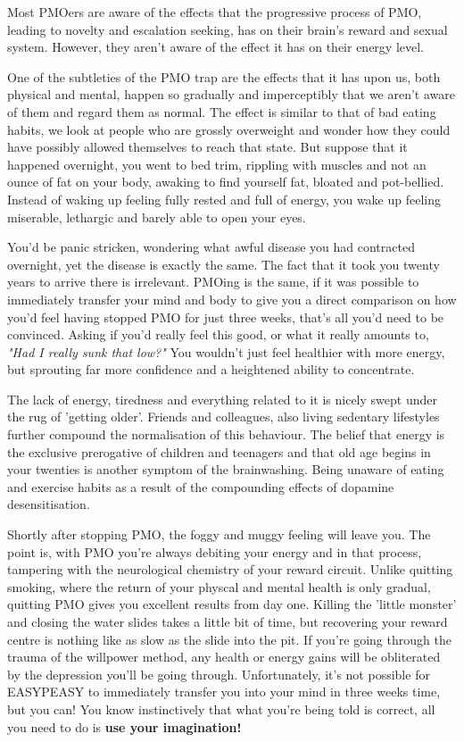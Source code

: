 \documentclass[easypeasy.tex]{subfiles}
\begin{document}
Most PMOers are aware of the effects that the progressive process of PMO, leading to novelty and escalation seeking, has on their brain's reward and sexual system. However, they aren't aware of the effect it has on their energy level.

One of the subtleties of the PMO trap are the effects that it has upon us, both physical and mental, happen so gradually and imperceptibly that we aren't aware of them and regard them as normal. The effect is similar to that of bad eating habits, we look at people who are grossly overweight and wonder how they could have possibly allowed themselves to reach that state. But suppose that it happened overnight, you went to bed trim, rippling with muscles and not an ounce of fat on your body, awaking to find yourself fat, bloated and pot-bellied. Instead of waking up feeling fully rested and full of energy, you wake up feeling miserable, lethargic and barely able to open your eyes.

You'd be panic stricken, wondering what awful disease you had contracted overnight, yet the disease is exactly the same. The fact that it took you twenty years to arrive there is irrelevant. PMOing is the same, if it was possible to immediately transfer your mind and body to give you a direct comparison on how you'd feel having stopped PMO for just three weeks, that's all you'd need to be convinced. Asking if you'd really feel this good, or what it really amounts to, \textit{"Had I really sunk that low?"} You wouldn't just feel healthier with more energy, but sprouting far more confidence and a heightened ability to concentrate.

The lack of energy, tiredness and everything related to it is nicely swept under the rug of 'getting older'. Friends and colleagues, also living sedentary lifestyles further compound the normalisation of this behaviour. The belief that energy is the exclusive prerogative of children and teenagers and that old age begins in your twenties is another symptom of the brainwashing. Being unaware of eating and exercise habits as a result of the compounding effects of dopamine desensitisation.

Shortly after stopping PMO, the foggy and muggy feeling will leave you. The point is, with PMO you're always debiting your energy and in that process, tampering with the neurological chemistry of your reward circuit. Unlike quitting smoking, where the return of your physcal and mental health is only gradual, quitting PMO gives you excellent results from day one. Killing the 'little monster' and closing the water slides takes a little bit of time, but recovering your reward centre is nothing like as slow as the slide into the pit. If you're going through the trauma of the willpower method, any health or energy gains will be obliterated by the depression you'll be going through. Unfortunately, it's not possible for EASYPEASY to immediately transfer you into your mind in three weeks time, but you can! You know instinctively that what you're being told is correct, all you need to do is \textbf{use your imagination!}
\end{document}
